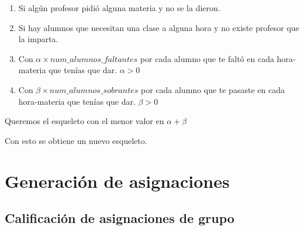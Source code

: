 \begin{enumerate}
\item Si algún profesor pidió alguna materia y no se la dieron.

\item Si hay alumnos que necesitan una clase a alguna hora y no existe profesor que la imparta.

\item Con $\alpha \times num\_alumnos\_faltantes$ por cada alumno que te faltó en cada hora-materia que tenías que dar. $\alpha > 0$

\item Con $\beta \times num\_alumnos\_sobrantes$ por cada alumno que te pasaste en cada hora-materia que tenías que dar. $\beta > 0$

\end{enumerate}

Queremos el esqueleto con el menor valor en $\alpha + \beta$

Con esto se obtiene un nuevo esqueleto.


\section{Generación de asignaciones}

\subsection{Calificación de asignaciones de grupo}


%
%
%
%





